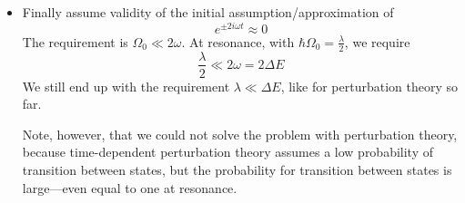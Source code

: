 \documentclass[11pt, a4paper]{article}
\begin{document}
\begin{itemize}
	\item Finally assume validity of the initial assumption/approximation of 
	\begin{equation*}
		e^{\pm 2i\omega t} \approx 0
	\end{equation*}
	The requirement is $ \Omega_{0} \ll 2 \omega $. At resonance, with $ 	\hbar \Omega_{0} = \frac{\lambda}{2} $, we require
	\begin{equation*}
		\frac{\lambda}{2} \ll 2 \omega = 2 \Delta E
	\end{equation*}
	We still end up with the requirement $ \lambda \ll \Delta E $, like for perturbation theory so far.
	
	Note, however, that we could not solve the problem with perturbation theory, because time-dependent perturbation theory assumes a low probability of transition between states, but the probability for transition between states is large---even equal to one at resonance.
	
	
\end{itemize}
\end{document}
